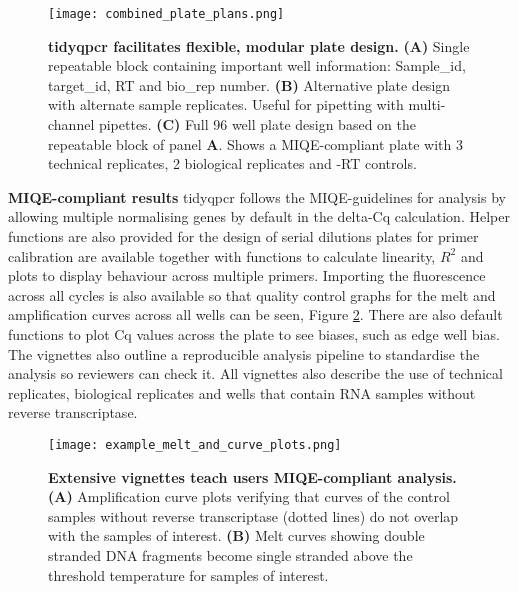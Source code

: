 \documentclass[../main.tex]{subfiles}
\begin{document}
\begin{figure}[p]

{\centering \texttt{[image: combined\_plate\_plans.png]} 

}

\caption[tidyqpcr facilitates flexible, modular plate design.]{\textbf{tidyqpcr facilitates flexible, modular plate design.} \textbf{(A)} Single repeatable block containing important well information: Sample\_id, target\_id, RT and bio\_rep number. 
\textbf{(B)} Alternative plate design with alternate sample replicates. Useful for pipetting with multi-channel pipettes. 
\textbf{(C)} Full 96 well plate design based on the repeatable block of panel \textbf{A}. 
Shows a MIQE-compliant plate with 3 technical replicates, 2 biological replicates and -RT controls.} \label{fig:combined-plate-design}
\end{figure}


\textbf{MIQE-compliant results} tidyqpcr follows the MIQE-guidelines for analysis by allowing multiple normalising genes by default in the delta-Cq calculation. 
Helper functions are also provided for the design of serial dilutions plates for primer calibration are available together with functions to calculate linearity, $R^2$ and plots to display behaviour across multiple primers.
Importing the fluorescence across all cycles is also available so that quality control graphs for the melt and amplification curves across all wells can be seen, Figure \ref{fig:plate-amp-curves}.
There are also default functions to plot Cq values across the plate to see biases, such as edge well bias. 
The vignettes also outline a reproducible analysis pipeline to standardise the analysis so reviewers can check it.
All vignettes also describe the use of technical replicates, biological replicates and wells that contain RNA samples without reverse transcriptase.

\begin{figure}[t]

{\centering \texttt{[image: example\_melt\_and\_curve\_plots.png]} 

}

\caption[Extensive vignettes teach users MIQE-compliant analysis.]{\textbf{Extensive vignettes teach users MIQE-compliant analysis.} \textbf{(A)} Amplification curve plots verifying that curves of the control samples without reverse transcriptase (dotted lines) do not overlap with the samples of interest.
\textbf{(B)} Melt curves showing double stranded DNA fragments become single stranded above the threshold temperature for samples of interest.} \label{fig:plate-amp-curves}
\end{figure}
\end{document}
